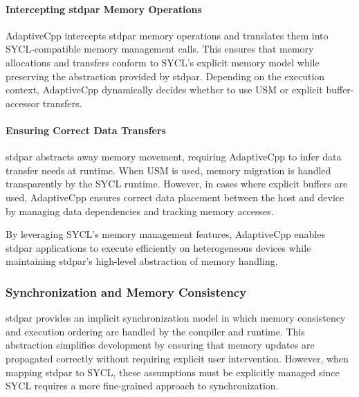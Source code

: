 \paragraph{Intercepting stdpar Memory Operations}
AdaptiveCpp intercepts stdpar memory operations and translates them into SYCL-compatible memory management
calls. This ensures that memory allocations and transfers conform to SYCL’s explicit memory model while preserving
the abstraction provided by stdpar. Depending on the execution context, AdaptiveCpp dynamically decides whether
to use USM or explicit buffer-accessor transfers.

\paragraph{Ensuring Correct Data Transfers}
stdpar abstracts away memory movement, requiring AdaptiveCpp to infer data transfer needs at runtime.
When USM is used, memory migration is handled transparently by the SYCL runtime. However, in cases where
explicit buffers are used, AdaptiveCpp ensures correct data placement between the host and device by managing
data dependencies and tracking memory accesses.

By leveraging SYCL’s memory management features, AdaptiveCpp enables stdpar applications to execute efficiently
on heterogeneous devices while maintaining stdpar’s high-level abstraction of memory handling.

\subsubsection{Synchronization and Memory Consistency}
\label{sec:synchronization}

stdpar provides an implicit synchronization model in which memory consistency and execution ordering are handled
by the compiler and runtime. This abstraction simplifies development by ensuring that memory updates are
propagated correctly without requiring explicit user intervention. However, when mapping stdpar to SYCL, these
assumptions must be explicitly managed since SYCL requires a more fine-grained approach to synchronization.

